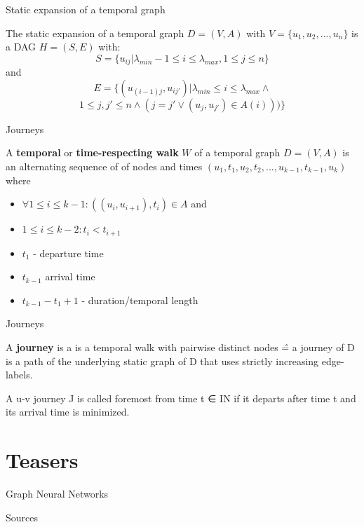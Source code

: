 \documentclass{beamer}
\begin{document}
\begin{frame}{Static expansion of a temporal graph}
  \begin{tcolorbox}[definitionstyle, title=Definition: static expansion of a graph]
    The static expansion of a temporal graph $D = (V, A)$ with $V = \{ u_1, u_2, ..., u_n \}$ is a DAG $H = (S, E)$ with:
    $$ S = \{ u_{ij} | \lambda_{min} - 1 \leq i \leq \lambda_{max}, 1 \leq j \leq n \} $$
    and
    $$ E = \{ (u_{(i - 1)j}, u_{ij'}) | \lambda_{min} \leq i \leq \lambda_{max} \land $$
    $$ 1 \leq j, j' \leq n \land (j = j' \lor (u_j, u_{j'}) \in A(i))) \} $$
  \end{tcolorbox}
\end{frame}






\begin{frame}{Journeys}
  \begin{tcolorbox}[definitionstyle, title=Definition: temporal/time respecting walk]
    A \textbf{temporal} or \textbf{time-respecting walk} $W$ of a temporal graph $D = (V, A)$ is an alternating sequence of of nodes and times $(u_1 , t_1 , u_2 , t_2 , ... , u_{k−1} , t_{k−1} , u_k )$
    where 
    \begin{itemize}
      \item $\forall 1 \leq i \leq k - 1: ((u_i , u_{i+1} ), t_i ) \in A$ and
      \item $1 \leq i \leq k − 2: t_i < t_{i + 1}$
    \end{itemize}
  \end{tcolorbox}
  \begin{itemize}
    \item $t_1$ - departure time
    \item $t_{k - 1}$ arrival time
    \item $t_{k - 1} - t_1 + 1$ - duration/temporal length
  \end{itemize}
\end{frame}

\begin{frame}{Journeys}
  \begin{tcolorbox}[definitionstyle, title=Definition: Journey]
    A \textbf{journey} is a is a temporal walk with pairwise distinct nodes \^{=} a journey of D is a path of the underlying static graph of D that uses
strictly increasing edge-labels.
  \end{tcolorbox}
  \begin{tcolorbox}[definitionstyle, title=Definition: Foremost Journey]
A u-v journey J is called foremost from time t ∈ IN if it
departs after time t and its arrival time is minimized.
  \end{tcolorbox}

\end{frame}
\section{Teasers}

\begin{frame}{Graph Neural Networks}
\end{frame}

\begin{frame}{Sources}
  
  
\end{frame}
\end{document}
